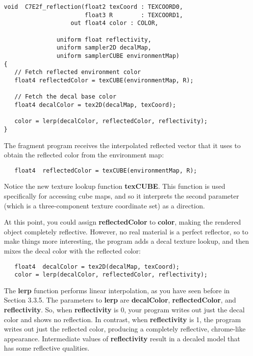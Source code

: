 \documentclass[../main.tex]{subfiles}
\begin{document}
\FloatBarrier
\begin{lstlisting}[caption=Example 7-2. The \textbf{C7E2f_reflection} Fragment Program]
void  C7E2f_reflection(float2 texCoord : TEXCOORD0,
                       float3 R        : TEXCOORD1,
                   out float4 color : COLOR,

               uniform float reflectivity,
               uniform sampler2D decalMap,
               uniform samplerCUBE environmentMap)
{
   // Fetch reflected environment color
   float4 reflectedColor = texCUBE(environmentMap, R);

   // Fetch the decal base color
   float4 decalColor = tex2D(decalMap, texCoord);

   color = lerp(decalColor, reflectedColor, reflectivity);
}
\end{lstlisting}
\FloatBarrier

The fragment program receives the interpolated reflected vector that it uses to obtain the reflected color from the environment map:

\FloatBarrier
\begin{lstlisting}
   float4  reflectedColor = texCUBE(environmentMap, R);
\end{lstlisting}
\FloatBarrier
   
Notice the new texture lookup function \textbf{texCUBE}. This function is used specifically for accessing cube maps, and so it interprets the second parameter (which is a three-component texture coordinate set) as a direction.

At this point, you could assign \textbf{reflectedColor} to \textbf{color}, making the rendered object completely reflective. However, no real material is a perfect reflector, so to make things more interesting, the program adds a decal texture lookup, and then mixes the decal color with the reflected color:

\FloatBarrier
\begin{lstlisting}
   float4  decalColor = tex2D(decalMap, texCoord);
   color = lerp(decalColor, reflectedColor, reflectivity);
\end{lstlisting}
\FloatBarrier
   
The \textbf{lerp} function performs linear interpolation, as you have seen before in Section 3.3.5. The parameters to \textbf{lerp} are \textbf{decalColor}, \textbf{reflectedColor}, and \textbf{reflectivity}. So, when \textbf{reflectivity} is 0, your program writes out just the decal color and shows no reflection. In contrast, when \textbf{reflectivity} is 1, the program writes out just the reflected color, producing a completely reflective, chrome-like appearance. Intermediate values of \textbf{reflectivity} result in a decaled model that has some reflective qualities.
\end{document}
